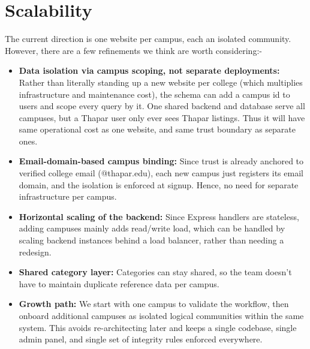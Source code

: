 \documentclass[12pt,a4paper]{article}
\begin{document}
\section{Scalability}
The current direction is one website per campus, each an isolated community. However, there are a few refinements we think are worth considering:-
\begin{itemize}[leftmargin=0.7cm]
    \item \textbf{Data isolation via campus scoping, not separate deployments:} Rather than literally standing up a new website per college (which multiplies infrastructure and maintenance cost), the schema can add a campus id to users and scope every query by it. One shared backend and database serve all campuses, but a Thapar user only ever sees Thapar listings. Thus it will have same operational cost as one website, and same trust boundary as separate ones.
    \item \textbf{Email-domain-based campus binding:} Since trust is already anchored to verified college email (@thapar.edu), each new campus just registers its email domain, and the isolation is enforced at signup. Hence, no need for separate infrastructure per campus.
    \item \textbf{Horizontal scaling of the backend:} Since Express handlers are stateless, adding campuses mainly adds read/write load, which can be handled by scaling backend instances behind a load balancer, rather than needing a redesign.
    \item \textbf{Shared category layer:} Categories can stay shared, so the team doesn't have to maintain duplicate reference data per campus.
    \item \textbf{Growth path:} We start with one campus to validate the workflow, then onboard additional campuses as isolated logical communities within the same system. This avoids re-architecting later and keeps a single codebase, single admin panel, and single set of integrity rules enforced everywhere.
\end{itemize}
\end{document}
